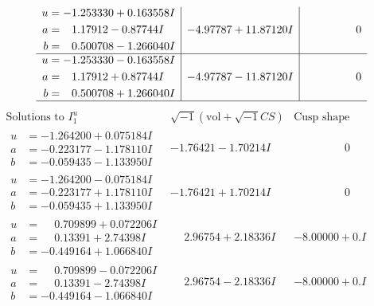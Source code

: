 \documentclass[1p]{elsarticle_modified}
\theoremstyle{definition}
\newcommand{\I}{\sqrt{-1}}
\begin{document}
$$\begin{array}{c|c|c}
\begin{aligned}
u &= -1.253330 + 0.163558 I \\
a &= \phantom{-}1.17912 - 0.87744 I \\
b &= \phantom{-}0.500708 - 1.266040 I\end{aligned}
 & -4.97787 + 11.87120 I & \phantom{-0.000000 } 0 \\ \hline\begin{aligned}
u &= -1.253330 - 0.163558 I \\
a &= \phantom{-}1.17912 + 0.87744 I \\
b &= \phantom{-}0.500708 + 1.266040 I\end{aligned}
 & -4.97787 - 11.87120 I & \phantom{-0.000000 } 0\\
 \hline 
 \end{array}$$\newpage$$\begin{array}{c|c|c}  
\text{Solutions to }I^u_{1}& \I (\text{vol} + \sqrt{-1}CS) & \text{Cusp shape}\\
 \hline 
\begin{aligned}
u &= -1.264200 + 0.075184 I \\
a &= -0.223177 - 1.178110 I \\
b &= -0.059435 - 1.133950 I\end{aligned}
 & -1.76421 - 1.70214 I & \phantom{-0.000000 } 0 \\ \hline\begin{aligned}
u &= -1.264200 - 0.075184 I \\
a &= -0.223177 + 1.178110 I \\
b &= -0.059435 + 1.133950 I\end{aligned}
 & -1.76421 + 1.70214 I & \phantom{-0.000000 } 0 \\ \hline\begin{aligned}
u &= \phantom{-}0.709899 + 0.072206 I \\
a &= \phantom{-}0.13391 + 2.74398 I \\
b &= -0.449164 + 1.066840 I\end{aligned}
 & \phantom{-}2.96754 + 2.18336 I & -8.00000 + 0. I\phantom{ +0.000000I} \\ \hline\begin{aligned}
u &= \phantom{-}0.709899 - 0.072206 I \\
a &= \phantom{-}0.13391 - 2.74398 I \\
b &= -0.449164 - 1.066840 I\end{aligned}
 & \phantom{-}2.96754 - 2.18336 I & -8.00000 + 0. I\phantom{ +0.000000I} \\ \hline\begin{aligned}

\end{aligned}
\end{array}$$
\end{document}
